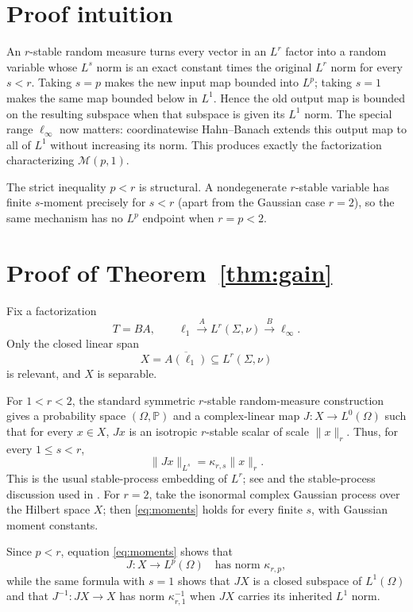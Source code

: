 \documentclass[11pt]{article}
\newcommand{\M}{\mathcal M}
\begin{document}
\section{Proof intuition}

An $r$-stable random measure turns every vector in an $L^r$ factor into a
random variable whose $L^s$ norm is an exact constant times the original
$L^r$ norm for every $s<r$.  Taking $s=p$ makes the new input map bounded
into $L^p$; taking $s=1$ makes the same map bounded below in $L^1$.  Hence the
old output map is bounded on the resulting subspace when that subspace is
given its $L^1$ norm.  The special range $\ell_\infty$ now matters:
coordinatewise Hahn--Banach extends this output map to all of $L^1$ without
increasing its norm.  This produces exactly the factorization characterizing
$\M(p,1)$.

The strict inequality $p<r$ is structural.  A nondegenerate $r$-stable
variable has finite $s$-moment precisely for $s<r$ (apart from the Gaussian
case $r=2$), so the same mechanism has no $L^p$ endpoint when $r=p<2$.

\section{Proof of Theorem~\ref{thm:gain}}

Fix a factorization
\[
             T=BA,\qquad
 \ell_1\xrightarrow{A}L^r(\Sigma,\nu)
       \xrightarrow{B}\ell_\infty.
\]
Only the closed linear span
\[
 X=\overline{A(\ell_1)}\subseteq L^r(\Sigma,\nu)
\]
is relevant, and $X$ is separable.

For $1<r<2$, the standard symmetric $r$-stable random-measure construction
gives a probability space $(\Omega,\mathbb P)$ and a complex-linear map
$J:X\to L^0(\Omega)$ such that for every $x\in X$, $Jx$ is an isotropic
$r$-stable scalar of scale $\|x\|_r$.  Thus, for every $1\le s<r$,
\begin{equation}\label{eq:moments}
                  \|Jx\|_{L^s}=\kappa_{r,s}\|x\|_r.
\end{equation}
This is the usual stable-process embedding of $L^r$; see
\cite[Chapter 3]{SamorodnitskyTaqqu1994} and the stable-process discussion
used in \cite[Theorem 6.4.19]{AlbiacKalton2006}.  For $r=2$, take the
isonormal complex Gaussian process over the Hilbert space $X$; then
\eqref{eq:moments} holds for every finite $s$, with Gaussian moment
constants.

Since $p<r$, equation \eqref{eq:moments} shows that
\[
 J:X\longrightarrow L^p(\Omega)
 \quad\text{has norm }\kappa_{r,p},
\]
while the same formula with $s=1$ shows that $JX$ is a closed subspace of
$L^1(\Omega)$ and that $J^{-1}:JX\to X$ has norm
$\kappa_{r,1}^{-1}$ when $JX$ carries its inherited $L^1$ norm.
\end{document}
